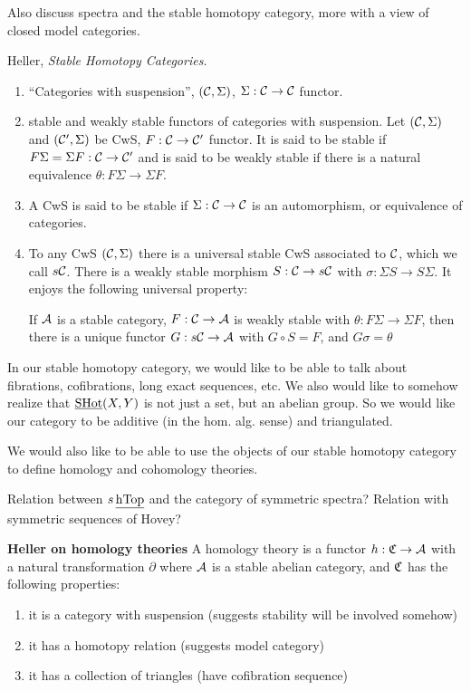\documentclass{article}%
\begin{document}
Also discuss spectra and the stable homotopy category, more with a
view of closed model categories.

Heller, {\it Stable Homotopy Categories.}

\begin{enumerate}
\item ``Categories with suspension'', $(\mathcal{C}, \Sigma)$,
  $\Sigma:\mathcal{C}\rightarrow\mathcal{C}$ functor.
\item stable and weakly stable functors of categories with
  suspension. Let $(\mathcal{C},\Sigma)$ and $(\mathcal{C}',\Sigma)$ be CwS,
  $F:\mathcal{C}\rightarrow \mathcal{C}'$ functor. It is said to be stable if
  $F\Sigma = \Sigma F : \mathcal{C} \rightarrow \mathcal{C}'$ and is said to be
  weakly stable if there is a natural equivalence $\theta : F \Sigma
  \rightarrow \Sigma F$. 
\item A CwS is said to be stable if $\Sigma : \mathcal{C} \rightarrow \mathcal{C}$
  is an automorphism, or equivalence of categories.
\item To any CwS $(\mathcal{C},\Sigma)$ there is a universal stable CwS
  associated to $\mathcal{C}$, which we call $s\mathcal{C}$. There is a weakly
  stable morphism $S:\mathcal{C}\rightarrow s\mathcal{C}$ with $\sigma : \Sigma S
  \rightarrow S \Sigma$. It enjoys the following universal property:
  \begin{proposition}
    If $\mathcal{A}$ is a stable category, $F:\mathcal{C}\rightarrow \mathcal{A} $ is
    weakly stable with $\theta : F\Sigma \rightarrow \Sigma F$, then
    there is a unique functor $G: s\mathcal{C} \rightarrow \mathcal{A}$ with
    $G\circ S = F$, and $G\sigma = \theta$
  \end{proposition}
\end{enumerate}

In our stable homotopy category, we would like to be able to talk
about fibrations, cofibrations, long exact sequences, etc. We also
would like to somehow realize that $\operatorname{\underline{SHot}}(X,Y)$ is not just a set, but
an abelian group. So we would like our category to be additive (in the
hom. alg. sense) and triangulated.

We would also like to be able to use the objects of our stable
homotopy category to define homology and cohomology theories.

Relation between $s\operatorname{\underline{hTop}}$ and the category of symmetric spectra?
Relation with symmetric sequences of Hovey? 

{\bf Heller on homology theories} A homology theory is a functor $h :
\mathfrak{C} \rightarrow \mathcal{A}$ with a natural transformation $\partial$
where $\mathcal{A}$ is a stable abelian category, and $\mathfrak{C}$ has the
following properties:
\begin{enumerate}
\item it is a category with suspension (suggests stability will be
  involved somehow)
\item it has a homotopy relation (suggests model category)
\item it has a collection of triangles (have cofibration sequence)
\end{enumerate}
\end{document}
